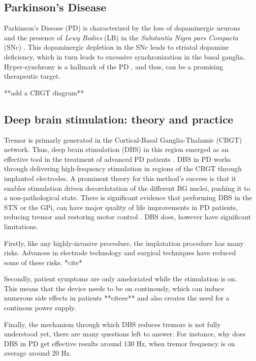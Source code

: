 \subsection{Parkinson's Disease}
Parkinson's Disease (PD) is characterized by the loss of dopaminergic neurons and the presence of
\emph{Lewy Bodies} (LB) in the \emph{Substantia Nigra pars Compacta} (SNc)
\cite{del2018advances}. This dopaminergic depletion in the SNc leads to striatal dopamine
deficiency, which in turn leads to excessive synchronization in the basal ganglia.
Hyper-synchrony is a hallmark of the PD \cite{hammond2007pathological, helmich2012cerebral},
and thus, can be a promising therapeutic target.

**add a CBGT diagram**

\subsection{Deep brain stimulation: theory and practice}
Tremor is primarly generated in the Cortical-Basal Ganglia-Thalamic (CBGT) network.
Thus, deep brain stimulation (DBS) in this region emerged as an effective tool in
the treatment of advanced PD patients \cite{del2018advances}.
DBS in PD works through delivering high-frequency stimulation in regions of the CBGT
through implanted electrodes.
A prominent theory for this method's success is that it enables stimulation driven
decorelatation of the different BG nuclei, pushing it to a non-pathological state.
There is significant evidence that performing DBS in the STN or the GPi, can have major quality
of life improvements in PD patients, reducing tremor and restoring motor control
\cite{rodriguez2005bilateral, rubin2004high}.
DBS does, however have significant limitations.

Firstly, like any highly-invasive procedure, the implatation procedure has many risks.
Advances in electrode technology and surgical techniques have reduced some of these risks.
*cite*

Secondly, patient symptoms are only ameloriated while the stimulation is on. This means that
the device needs to be on continously, which can induce numerous side effects in patients
**citeee** and also creates the need for a continous power supply.

Finally, the mechanism through which DBS reduces tremors is not fully understood yet, there
are many questions left to answer. For instance, why does DBS in PD get effective results around
130 Hz, when tremor frequency is on average around 20 Hz.

